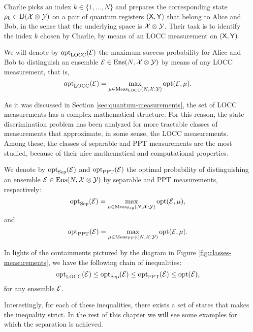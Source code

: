 Charlie picks an index $k \in \{1, \ldots, N\}$ and prepares the corresponding 
state $\rho_{k} \in \mathrm{D}(\mathcal{X}\otimes\mathcal{Y})$ on a pair of quantum registers 
$(\mathsf{X},\mathsf{Y})$ that belong to Alice and Bob, in the sense that the 
underlying space is $\mathcal{X}\otimes\mathcal{Y}$.
Their task is to identify the index $k$ chosen by Charlie, by means of an LOCC 
measurement on $(\mathsf{X},\mathsf{Y})$.

We will denote by $\operatorname{opt}_{\mathrm{LOCC}}(\mathcal{E})$ the maximum success probability for
Alice and Bob to distinguish an ensemble $\mathcal{E}\in\mathrm{Ens}(N, \mathcal{X}\otimes\mathcal{Y})$ by means of 
any LOCC measurement, that is, 
\begin{equation}
\label{eq:opt-LOCC}
  \operatorname{opt}_{\mathrm{LOCC}}(\mathcal{E}) = \max_{\mu \in \mathrm{Meas}_{\mathrm{LOCC}}(N, \mathcal{X}:\mathcal{Y})}\operatorname{opt}(\mathcal{E}, \mu).
\end{equation}

As it was discussed in Section \ref{sec:quantum-measurements}, the set of 
LOCC measurements has a complex mathematical structure.
For this reason, the state discrimination problem has been analyzed for more 
tractable classes of measurements that approximate, in some sense, 
the LOCC measurements.
Among these, the classes of separable and PPT measurements are the most studied,
because of their nice mathematical and computational properties.

We denote by $\operatorname{opt}_{\mathrm{Sep}}(\mathcal{E})$ and $\operatorname{opt}_{\mathrm{PPT}}(\mathcal{E})$ the optimal probability of
distinguishing an ensemble 
$
  \mathcal{E} \in \mathrm{Ens}(N, \mathcal{X}\otimes\mathcal{Y})
$ 
by separable and PPT measurements, respectively:
\begin{equation}
\label{eq:opt-Sep}
  \operatorname{opt}_{\mathrm{Sep}}(\mathcal{E}) = \max_{\mu \in \mathrm{Meas}_{\mathrm{Sep}}(N, \mathcal{X}:\mathcal{Y})}\operatorname{opt}(\mathcal{E}, \mu),
\end{equation}
and
\begin{equation}
\label{eq:opt-PPT}
  \operatorname{opt}_{\mathrm{PPT}}(\mathcal{E}) = \max_{\mu \in \mathrm{Meas}_{\mathrm{PPT}}(N, \mathcal{X}:\mathcal{Y})}\operatorname{opt}(\mathcal{E}, \mu).
\end{equation}


In lights of the containments pictured by the diagram in Figure \ref{fig:classes-measurements},
we have the following chain of inequalities:  
\begin{equation}
\label{eq:inequality-chain}
  \operatorname{opt}_{\mathrm{LOCC}}(\mathcal{E}) \leq \operatorname{opt}_{\mathrm{Sep}}(\mathcal{E}) \leq \operatorname{opt}_{\mathrm{PPT}}(\mathcal{E}) \leq \operatorname{opt}(\mathcal{E}),
\end{equation}
for any ensemble $\mathcal{E}$.

Interestingly, for each of these inequalities, there exists a set of states 
that makes the inequality strict.
In the rest of this chapter we will see some examples for which the separation 
is achieved.  

